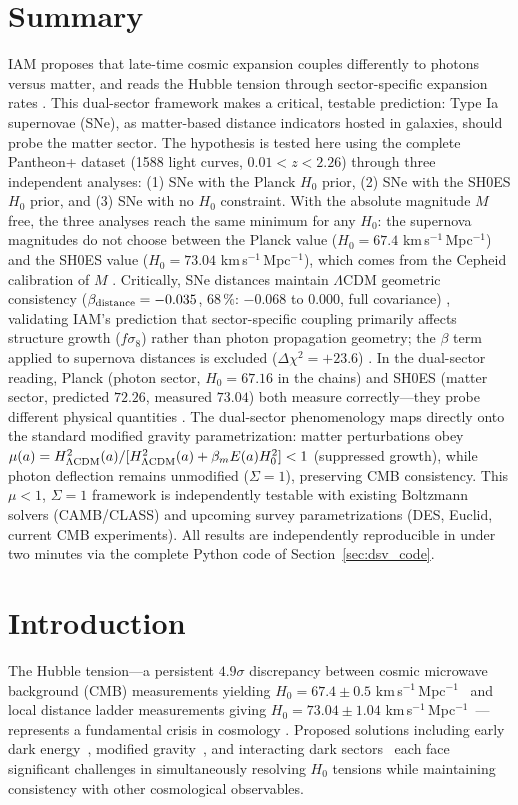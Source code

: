 \section*{Summary}
IAM proposes that late-time cosmic expansion couples differently to photons versus matter, and reads the Hubble
tension through sector-specific expansion rates \interp. This dual-sector framework makes a critical, testable prediction: Type Ia supernovae (SNe), as
matter-based distance indicators hosted in galaxies, should probe the matter sector. The hypothesis is tested here using the complete Pantheon+ dataset
(1588 light curves, $0.01<z<2.26$) through three independent analyses: (1) SNe with the Planck $H_0$ prior, (2) SNe with the SH0ES
$H_0$ prior, and (3) SNe with no $H_0$ constraint. With the absolute magnitude $M$ free, the three analyses reach the same minimum for any $H_0$: the
supernova magnitudes do not choose between the Planck value ($H_0=67.4$ km\,s$^{-1}$\,Mpc$^{-1}$) and the SH0ES value
($H_0=73.04$ km\,s$^{-1}$\,Mpc$^{-1}$), which comes from the Cepheid calibration of $M$ \derived. Critically, SNe distances maintain $\Lambda$CDM
geometric consistency ($\beta_{\rm distance}=-0.035$, $68\,\%$: $-0.068$ to $0.000$, full covariance) \observed, validating IAM's prediction that
sector-specific coupling primarily affects structure growth ($f\sigma_8$) rather than photon propagation geometry; the $\beta$ term applied to supernova
distances is excluded ($\Delta\chi^2=+23.6$) \calc. In the dual-sector reading, Planck (photon sector, $H_0=67.16$ in the chains) and SH0ES (matter sector, predicted $72.26$, measured $73.04$)
both measure correctly---they probe different physical quantities \interp. The dual-sector phenomenology maps directly onto the standard modified gravity
parametrization: matter perturbations obey $\mu(a)=H^2_{\Lambda\rm CDM}(a)/[H^2_{\Lambda\rm CDM}(a)+\beta_mE(a)H_0^2]<1$ (suppressed growth), while
photon deflection remains unmodified ($\Sigma=1$), preserving CMB consistency. This $\mu<1$, $\Sigma=1$ framework is independently testable with existing
Boltzmann solvers (CAMB/CLASS) and upcoming survey parametrizations (DES, Euclid, current CMB experiments). All results are independently reproducible in under two minutes
via the complete Python code of Section~\ref{sec:dsv_code}.

\section{Introduction}\label{sec:dsv_question}
The Hubble tension---a persistent $4.9\sigma$ discrepancy between cosmic microwave background (CMB) measurements yielding $H_0=67.4\pm0.5$
km\,s$^{-1}$\,Mpc$^{-1}$~\cite{Planck2018VI} and local distance ladder measurements giving $H_0=73.04\pm1.04$ km\,s$^{-1}$\,Mpc$^{-1}$~\cite{Riess2022}---represents
a fundamental crisis in cosmology \observed. Proposed solutions including early dark energy~\cite{Kamionkowski2023}, modified gravity~\cite{Amendola2018},
and interacting dark sectors~\cite{DiValentino2021} each face significant challenges in simultaneously resolving $H_0$ tensions while maintaining
consistency with other cosmological observables.

